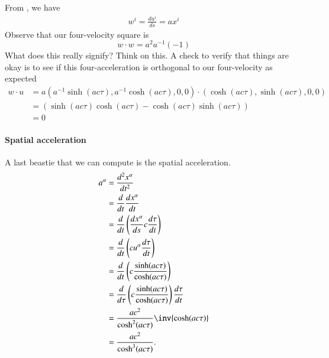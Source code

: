 {%
%
From , we have
%
\begin{equation}\label{eqn:relativisticElectrodynamicsT2:2160}
\begin{aligned}
w^i = \frac{ du^i }{ds} = a x^i
\end{aligned}
\end{equation}
%
Observe that our four-velocity square is
%
\begin{equation}\label{eqn:relativisticElectrodynamicsT2:78}
w \cdot w = a^2 a^{-1} (-1)
\end{equation}
%
What does this really signify?  Think on this.  A check to verify that things are okay is to see if this four-acceleration is orthogonal to our four-velocity as expected
%
\begin{equation}\label{eqn:relativisticElectrodynamicsT2:2180}
\begin{aligned}
w \cdot u
&=
a ( a^{-1} \sinh( a c \tau), a^{-1} \cosh( a c \tau ), 0, 0 ) \cdot ( \cosh( a c \tau ), \sinh( a c \tau ), 0, 0) \\
&=
( \sinh(a c \tau)\cosh(a c \tau) - \cosh(a c \tau) \sinh(a c \tau) ) \\
&=
0
\end{aligned}
\end{equation}
%
\paragraph{Spatial acceleration}

A last beastie that we can compute is the spatial acceleration.
%
\begin{equation}\label{eqn:relativisticElectrodynamicsT2:2200}
\begin{aligned}
a^\alpha
&= \frac{d^2 x^\alpha}{dt^2} \\
&= \frac{d}{dt} \frac{dx^\alpha}{dt} \\
&= \frac{d}{dt} \left( \frac{dx^\alpha}{ds} c \frac{d\tau}{dt} \right) \\
&= \frac{d}{dt} \left( c u^\alpha \frac{d\tau}{dt} \right) \\
&= \frac{d}{dt} \left( c \frac{\sinh(a c \tau)}{\cosh(a c \tau)} \right) \\
&= \frac{d}{d\tau} \left( c \frac{\sinh(a c \tau)}{\cosh(a c \tau)} \right) \frac{d\tau}{dt} \\
&= \frac{a c^2}{\cosh^2(a c \tau)} \inv{\cosh(a c \tau) } \\
&= \frac{a c^2}{\cosh^3(a c \tau)}.
\end{aligned}
\end{equation}
%
}
